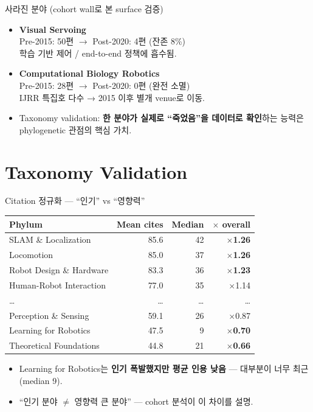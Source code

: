 \documentclass[aspectratio=169,t]{beamer}
\newcommand{\hot}[1]{\textcolor{accentorange}{\textbf{#1}}}
\newcommand{\cool}[1]{\textcolor{accentblue}{\textbf{#1}}}
\newcommand{\muted}[1]{\textcolor{mutedgray}{#1}}
\begin{document}
\begin{frame}{사라진 분야 (cohort wall로 본 surface 검증)}
\begin{itemize}
  \item \hot{Visual Servoing} \\
        Pre-2015: 50편 $\to$ Post-2020: 4편 (잔존 8\%)\\
        \muted{학습 기반 제어 / end-to-end 정책에 흡수됨.}
  \item \hot{Computational Biology Robotics} \\
        Pre-2015: 28편 $\to$ Post-2020: 0편 (완전 소멸)\\
        \muted{IJRR 특집호 다수 → 2015 이후 별개 venue로 이동.}
  \item Taxonomy validation: \cool{한 분야가 실제로 ``죽었음''을 데이터로 확인}하는 능력은 phylogenetic 관점의 핵심 가치.
\end{itemize}
\end{frame}


\section{Taxonomy Validation}

\begin{frame}{Citation 정규화 — ``인기'' vs ``영향력''}
\centering\small
\begin{tabular}{@{}lrrr@{}}
\toprule
\textbf{Phylum} & \textbf{Mean cites} & \textbf{Median} & \textbf{$\times$ overall} \\
\midrule
SLAM \& Localization      & 85.6 & 42 & \cool{$\times$1.26} \\
Locomotion                & 85.0 & 37 & \cool{$\times$1.26} \\
Robot Design \& Hardware  & 83.3 & 36 & \cool{$\times$1.23} \\
Human-Robot Interaction   & 77.0 & 35 & $\times$1.14 \\
\dots                      & \dots & \dots & \dots \\
Perception \& Sensing     & 59.1 & 26 & $\times$0.87 \\
Learning for Robotics     & 47.5 &  9 & \hot{$\times$0.70} \\
Theoretical Foundations   & 44.8 & 21 & \hot{$\times$0.66} \\
\bottomrule
\end{tabular}
\vfill
\begin{itemize}\small
\item Learning for Robotics는 \hot{인기 폭발했지만 평균 인용 낮음} — 대부분이 너무 최근 (median 9).
\item ``인기 분야 $\ne$ 영향력 큰 분야'' — cohort 분석이 이 차이를 설명.
\end{itemize}
\end{frame}
\end{document}
